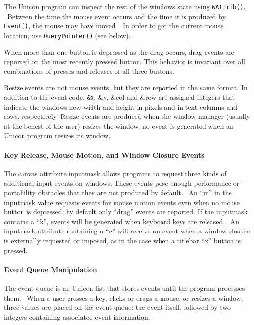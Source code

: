 The Unicon program can inspect the rest of the window{\textquotesingle}s
state using \texttt{WAttrib()}. \ Between the time the mouse event
occurs and the time it is produced by \texttt{Event()}, the mouse may
have moved. \ In order to get the current mouse location, use
\texttt{QueryPointer()} (see below).

When more than one button is depressed as the drag occurs, drag events
are reported on the most recently pressed button. This behavior is
invariant over all combinations of presses and releases of all three
buttons.

Resize events are not mouse events, but they are reported in the same
format. In addition to the event code, \texttt{\&x}, \&y, \&col and
\&row are assigned integers that indicate the window{\textquotesingle}s
new width and height in pixels and in text columns and rows,
respectively. Resize events are produced when the window manager
(usually at the behest of the user) resizes the window; no event is
generated when an Unicon program resizes its window.

\paragraph{Key Release, Mouse Motion, and Window Closure Events}
The canvas attribute inputmask allows programs to request three kinds of
additional input events on windows. These events pose enough
performance or portability obstacles that they are not produced by
default. \ An {\textquotedblleft}m{\textquotedblright} in the inputmask
value requests events for mouse motion events even when no mouse button
is depressed; by default only
{\textquotedblleft}drag{\textquotedblright} events are reported. If the
inputmask contains a {\textquotedblleft}k{\textquotedblright}, events
will be generated when keyboard keys are released. \ An inputmask
attribute containing a {\textquotedblleft}c{\textquotedblright} will
receive an event when a window closure is externally requested or
imposed, as in the case when a titlebar
{\textquotedblleft}x{\textquotedblright} button is pressed.

\paragraph{Event Queue Manipulation}
The event queue is an Unicon list that stores events until the program
processes them. \ When a user presses a key, clicks or drags a mouse,
or resizes a window, three values are placed on the event queue: the
event itself, followed by two integers containing associated event
information.

